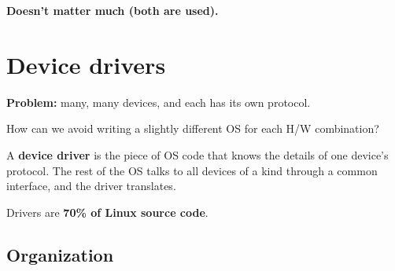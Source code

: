 \documentclass[11pt,a4paper]{article}
\begin{document}
\textbf{Doesn't matter much (both are used).}

\section{Device drivers}

\begin{warnbox}
\textbf{Problem:} many, many devices, and each has its own protocol.

How can we avoid writing a slightly different OS for each H/W combination?
\end{warnbox}

\begin{keybox}
A \textbf{device driver} is the piece of OS code that knows the details of
one device's protocol. The rest of the OS talks to all devices of a kind
through a common interface, and the driver translates.

Drivers are \textbf{70\% of Linux source code}.
\end{keybox}

\subsection{Organization}
\end{document}
